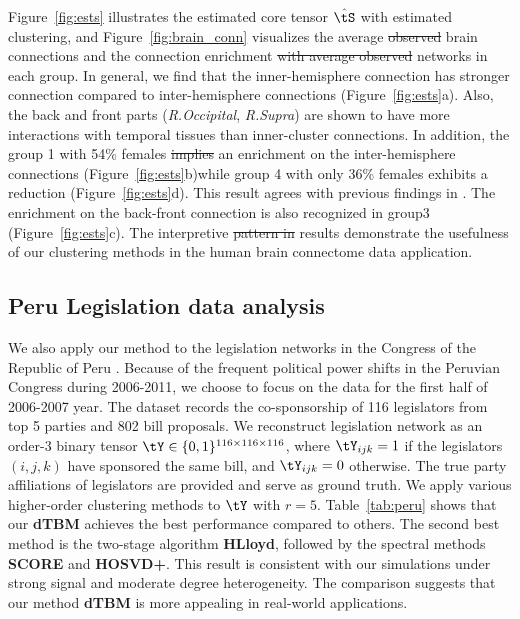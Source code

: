 \documentclass[lettersize,onecolumn,journal]{IEEEtran}
\theoremstyle{definition}
\theoremstyle{definition}
\providecommand{\DIFaddtex}[1]{{\protect\color{blue}\uwave{#1}}} %
\providecommand{\DIFdeltex}[1]{{\protect\color{red}\sout{#1}}}                      %
\providecommand{\DIFaddbegin}{} %
\providecommand{\DIFaddend}{} %
\providecommand{\DIFdelbegin}{} %
\providecommand{\DIFdelend}{} %
\providecommand{\DIFadd}[1]{\texorpdfstring{\DIFaddtex{#1}}{#1}} %
\providecommand{\DIFdel}[1]{\texorpdfstring{\DIFdeltex{#1}}{}} %
\newcommand{\DIFscaledelfig}{0.5}
\newlength{\DIFdelgraphicswidth} %
\newlength{\DIFdelgraphicsheight} %
\newcommand{\DIFaddincludegraphics}[2][]{{\color{blue}\fbox{\DIFOincludegraphics[#1]{#2}}}} %
\newcommand{\DIFdelincludegraphics}[2][]{%
\sbox{\DIFdelgraphicsbox}{\DIFOincludegraphics[#1]{#2}}%
\settoboxwidth{\DIFdelgraphicswidth}{\DIFdelgraphicsbox} %
\settoboxtotalheight{\DIFdelgraphicsheight}{\DIFdelgraphicsbox} %
\scalebox{\DIFscaledelfig}{%
\parbox[b]{\DIFdelgraphicswidth}{\usebox{\DIFdelgraphicsbox}\\[-\baselineskip] \rule{\DIFdelgraphicswidth}{0em}}\llap{\resizebox{\DIFdelgraphicswidth}{\DIFdelgraphicsheight}{%
\setlength{\unitlength}{\DIFdelgraphicswidth}%
\begin{picture}(1,1)%
\thicklines\linethickness{2pt} %
{\color[rgb]{1,0,0}\put(0,0){\framebox(1,1){}}}%
{\color[rgb]{1,0,0}\put(0,0){\line( 1,1){1}}}%
{\color[rgb]{1,0,0}\put(0,1){\line(1,-1){1}}}%
\end{picture}%
}\hspace*{3pt}}} %
} %
\DeclareRobustCommand{\DIFaddbegin}{\DIFOaddbegin \let\includegraphics\DIFaddincludegraphics} %
\DeclareRobustCommand{\DIFaddend}{\DIFOaddend \let\includegraphics\DIFOincludegraphics} %
\DeclareRobustCommand{\DIFdelbegin}{\DIFOdelbegin \let\includegraphics\DIFdelincludegraphics} %
\DeclareRobustCommand{\DIFdelend}{\DIFOaddend \let\includegraphics\DIFOincludegraphics} %
\begin{document}
Figure~\ref{fig:ests} illustrates the estimated core tensor $\hat \tS$ with estimated clustering, and Figure~\ref{fig:brain_conn} visualizes the average \DIFdelbegin \DIFdel{observed }\DIFdelend brain connections and the connection enrichment \DIFdelbegin \DIFdel{with average observed }\DIFdelend \DIFaddbegin \DIFadd{in contrast to average }\DIFaddend networks in each group. In general, we find that the inner-hemisphere connection has stronger connection compared to inter-hemisphere connections (Figure~\ref{fig:ests}a). Also, the back and front parts (\emph{R.Occipital}, \emph{R.Supra}) are shown to have more interactions with temporal tissues than inner-cluster connections. In addition, the group 1 with 54\% females \DIFdelbegin \DIFdel{implies }\DIFdelend \DIFaddbegin \DIFadd{shows }\DIFaddend an enrichment on the inter-hemisphere connections (Figure~\ref{fig:ests}b)\DIFaddbegin \DIFadd{, }\DIFaddend while group 4 with only 36\% females exhibits a reduction (Figure~\ref{fig:ests}d). This result agrees with previous findings in \cite{hu2021generalized}. The enrichment on the back-front connection is also recognized in group\DIFaddbegin \DIFadd{~}\DIFaddend 3 (Figure~\ref{fig:ests}c). The interpretive \DIFdelbegin \DIFdel{pattern in }\DIFdelend \DIFaddbegin \DIFadd{patterns in our }\DIFaddend results demonstrate the usefulness of our clustering methods in the human brain connectome data application. 


\subsection{Peru Legislation data analysis}

We also apply our method to the legislation networks in the Congress of the Republic of Peru \citep{lee2017time}. Because of the frequent political power shifts in the Peruvian Congress during 2006-2011, we choose to focus on the data for the first half of 2006-2007 year. The dataset records the co-sponsorship of 116 legislators from top 5 parties and 802 bill proposals. We reconstruct legislation network as an order-3 binary tensor $\tY \in \{0,1\}^{116 \times 116 \times 116}$, where $\tY_{ijk} = 1$ if the legislators $(i,j,k)$ have sponsored the same bill, and $\tY_{ijk} = 0$ otherwise. The true party affiliations of legislators are provided and serve as \DIFaddbegin \DIFadd{the }\DIFaddend ground truth. We apply various higher-order clustering methods to $\tY$ with $r = 5$. Table~\ref{tab:peru} shows that our \textbf{\small dTBM} achieves the best performance compared to others. The second best method is the two-stage algorithm \textbf{\small HLloyd}, followed by the spectral methods \textbf{\small SCORE} and \textbf{\small HOSVD+}. This result is consistent with our simulations under strong signal and moderate degree heterogeneity. The comparison suggests that our method \textbf{\small dTBM} is more appealing in real-world applications.
\end{document}

